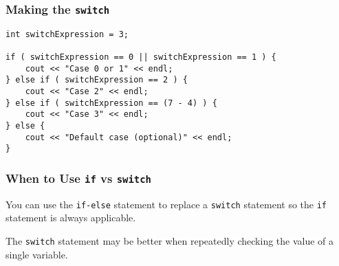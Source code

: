 \begin{frame}[fragile]
\frametitle{Making the \texttt{switch}}

{\scriptsize
\begin{verbatim}
int switchExpression = 3;

if ( switchExpression == 0 || switchExpression == 1 ) {
    cout << "Case 0 or 1" << endl;
} else if ( switchExpression == 2 ) {
    cout << "Case 2" << endl;
} else if ( switchExpression == (7 - 4) ) {
    cout << "Case 3" << endl;
} else {
    cout << "Default case (optional)" << endl;
}
\end{verbatim}
}

\end{frame}

\begin{frame}
\frametitle{When to Use \texttt{if} vs \texttt{switch}}

You can use the \texttt{if-else} statement to replace a \texttt{switch} statement so the \texttt{if} statement is always applicable.

The \texttt{switch} statement may be better when repeatedly checking the value of a single variable.

\end{frame} 





